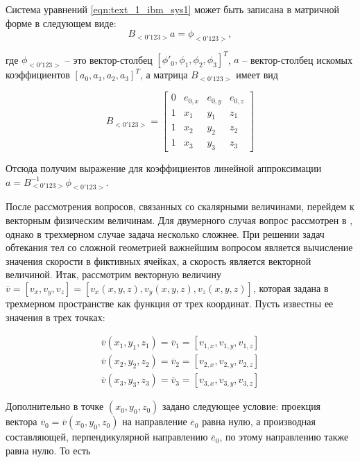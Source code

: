 Система уравнений \eqref{eqn:text_1_ibm_sys1} может быть записана в матричной форме в следующем виде:
\begin{equation}
	B_{<0'123>}a = \phi_{<0'123>},
\end{equation}

где $\phi_{<0'123>}$ -- это вектор-столбец $[\phi'_0, \phi_1, \phi_2, \phi_3]^T$, $a$ -- вектор-столбец искомых коэффициентов $[a_0, a_1, a_2, a_3]^T$, а матрица $B_{<0'123>}$ имеет вид

\begin{equation}\label{eqn:text_1_ibm_B1}
	B_{<0'123>} =
	\begin{bmatrix}
		0 & e_{0,x} & e_{0,y} & e_{0,z} \\
		1 & x_1 & y_1 & z_1 \\
		1 & x_2 & y_2 & z_2 \\
		1 & x_3 & y_3 & z_3
	\end{bmatrix}
\end{equation}

Отсюда получим выражение для коэффициентов линейной аппроксимации $a = B_{<0'123>}^{-1}\phi_{<0'123>}$.

После рассмотрения вопросов, связанных со скалярными величинами, перейдем к векторным физическим величинам.
Для двумерного случая вопрос рассмотрен в \cite{Vinnikov2007Immersed}, однако в трехмерном случае задача несколько сложнее.
При решении задач обтекания тел со сложной геометрией важнейшим вопросом является вычисление значения скорости в фиктивных ячейках, а скорость является векторной величиной.
Итак, рассмотрим векторную величину $\overline{v} = [v_x, v_y, v_z] = [v_x(x, y, z), v_y(x, y, z), v_z(x, y, z)]$, которая задана в трехмерном пространстве как функция от трех координат.
Пусть известны ее значения в трех точках:

\begin{equation}
	\begin{aligned}
		\overline{v}(x_1, y_1, z_1) = \overline{v}_1 = [v_{1,x}, v_{1,y}, v_{1,z}] \\
		\overline{v}(x_2, y_2, z_2) = \overline{v}_2 = [v_{2,x}, v_{2,y}, v_{2,z}] \\
		\overline{v}(x_3, y_3, z_3) = \overline{v}_3 = [v_{3,x}, v_{3,y}, v_{3,z}]
	\end{aligned}
\end{equation}

Дополнительно в точке $(x_0, y_0, z_0)$ задано следующее условие: проекция вектора $\overline{v}_0 = \overline{v}(x_0, y_0, z_0)$ на направление $\overline{e}_0$ равна нулю, а производная составляющей, перпендикулярной направлению $\overline{e}_0$, по этому направлению также равна нулю.
То есть

